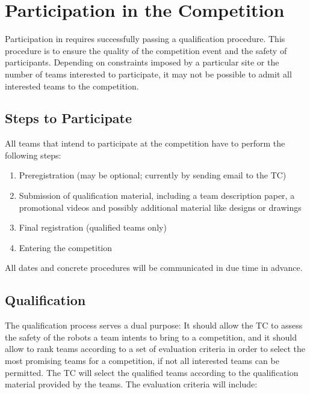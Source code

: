 \section{Participation in the Competition}\label{sec:participation_in_the_competition}
Participation in \RCAW requires successfully passing a qualification procedure. This procedure is to ensure the quality of the competition event and the safety of participants. Depending on constraints imposed by a particular site or the number of teams interested to participate, it may not be possible to admit all interested teams to the competition.


\subsection{Steps to Participate}
All teams that intend to participate at the competition have to perform the following steps:

\begin{enumerate}
	\item Preregistration (may be optional; currently by sending email to the TC)
	\item Submission of qualification material, including a team description paper, a promotional videos and possibly additional material like designs or drawings
	\item Final registration (qualified teams only)
  \item Entering the competition
\end{enumerate}


All dates and concrete procedures will be communicated in due time in advance.

\subsection{Qualification}
The qualification process serves a dual purpose: It should allow the TC to assess the safety of the robots a team intents to bring to a competition, and it should allow to rank teams according to a set of evaluation criteria in order to select the most promising teams for a competition, if not all interested teams can be permitted. The TC will select the qualified teams according to the qualification material provided by the teams. The evaluation criteria will include:

